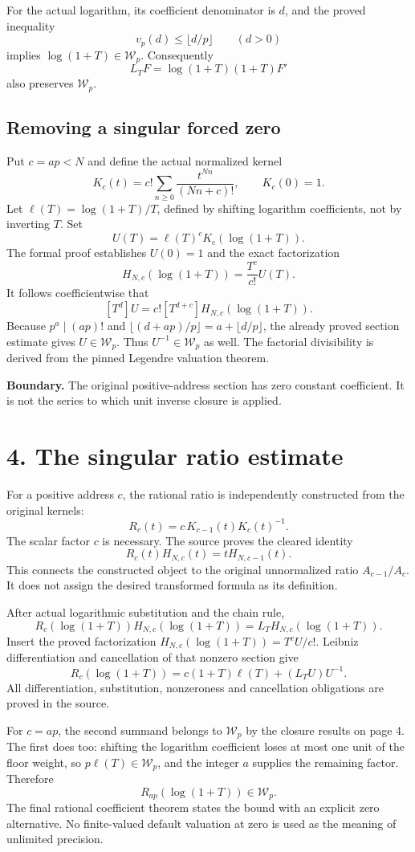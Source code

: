 \documentclass[11pt]{article}
\newcommand{\Wp}{\mathcal W_p}\newcommand{\ord}{\operatorname{ord}}
\newcommand{\coef}[2]{[#1^{#2}]}
\begin{document}
For the actual logarithm, its coefficient denominator is $d$, and the proved inequality
\[
 v_p(d)\le\lfloor d/p\rfloor\qquad(d>0)
\]
implies $\log(1+T)\in\Wp$. Consequently
\[
 L_TF=\log(1+T)(1+T)F'
\]
also preserves $\Wp$.

\subsection*{Removing a singular forced zero}
Put $c=ap<N$ and define the actual normalized kernel
\[
 K_c(t)=c!\sum_{n\ge0}\frac{t^{Nn}}{(Nn+c)!},\qquad K_c(0)=1.
\]
Let $\ell(T)=\log(1+T)/T$, defined by shifting logarithm coefficients, not by inverting $T$. Set
\[
 U(T)=\ell(T)^cK_c(\log(1+T)).
\]
The formal proof establishes $U(0)=1$ and the exact factorization
\[
 H_{N,c}(\log(1+T))=\frac{T^c}{c!}U(T).
\]
It follows coefficientwise that
\[
 \coef{T}{d}U=c!\coef{T}{d+c}H_{N,c}(\log(1+T)).
\]
Because $p^a\mid(ap)!$ and $\lfloor(d+ap)/p\rfloor=a+\lfloor d/p\rfloor$, the already proved section estimate gives $U\in\Wp$. Thus $U^{-1}\in\Wp$ as well. The factorial divisibility is derived from the pinned Legendre valuation theorem.

\textbf{Boundary.} The original positive-address section has zero constant coefficient. It is not the series to which unit inverse closure is applied.
\newpage
\section*{4. The singular ratio estimate}
For a positive address $c$, the rational ratio is independently constructed from the original kernels:
\[
 R_c(t)=c\,K_{c-1}(t)K_c(t)^{-1}.
\]
The scalar factor $c$ is necessary. The source proves the cleared identity
\[
 \boxed{R_c(t)H_{N,c}(t)=tH_{N,c-1}(t).}
\]
This connects the constructed object to the original unnormalized ratio $A_{c-1}/A_c$. It does not assign the desired transformed formula as its definition.

After actual logarithmic substitution and the chain rule,
\[
 R_c(\log(1+T))H_{N,c}(\log(1+T))
 =L_TH_{N,c}(\log(1+T)).
\]
Insert the proved factorization $H_{N,c}(\log(1+T))=T^cU/c!$. Leibniz differentiation and cancellation of that nonzero section give
\[
 \boxed{R_c(\log(1+T))
 =c(1+T)\ell(T)+(L_TU)U^{-1}.}
\]
All differentiation, substitution, nonzeroness and cancellation obligations are proved in the source.

For $c=ap$, the second summand belongs to $\Wp$ by the closure results on page 4. The first does too: shifting the logarithm coefficient loses at most one unit of the floor weight, so $p\ell(T)\in\Wp$, and the integer $a$ supplies the remaining factor. Therefore
\[
 \boxed{R_{ap}(\log(1+T))\in\Wp.}
\]
The final rational coefficient theorem states the bound with an explicit zero alternative. No finite-valued default valuation at zero is used as the meaning of unlimited precision.
\end{document}
